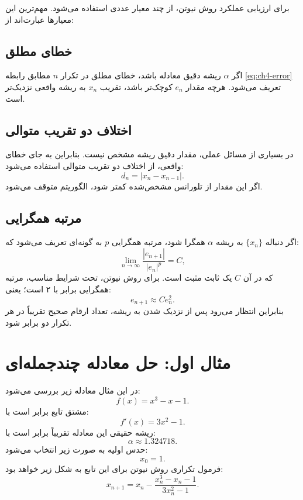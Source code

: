 برای ارزیابی عملکرد روش نیوتن، از چند معیار عددی استفاده می‌شود. مهم‌ترین این معیارها عبارت‌اند از:

\subsection{خطای مطلق}

اگر $\alpha$ ریشه دقیق معادله باشد، خطای مطلق در تکرار $n$ مطابق رابطه \eqref{eq:ch4-error} تعریف می‌شود. هرچه مقدار $e_n$ کوچک‌تر باشد، تقریب $x_n$ به ریشه واقعی نزدیک‌تر است.

\subsection{اختلاف دو تقریب متوالی}

در بسیاری از مسائل عملی، مقدار دقیق ریشه مشخص نیست. بنابراین به جای خطای واقعی، از اختلاف دو تقریب متوالی استفاده می‌شود:
\begin{equation}
d_n = |x_n-x_{n-1}|.
\label{eq:ch4-diff}
\end{equation}
اگر این مقدار از تلورانس مشخص‌شده کمتر شود، الگوریتم متوقف می‌شود.

\subsection{مرتبه همگرایی}

اگر دنباله $\{x_n\}$ به ریشه $\alpha$ همگرا شود، مرتبه همگرایی $p$ به گونه‌ای تعریف می‌شود که:
\begin{equation}
\lim_{n\to\infty}\frac{|e_{n+1}|}{|e_n|^p}=C,
\label{eq:ch4-order}
\end{equation}
که در آن $C$ یک ثابت مثبت است. برای روش نیوتن، تحت شرایط مناسب، مرتبه همگرایی برابر با ۲ است؛ یعنی:
\begin{equation}
e_{n+1}\approx C e_n^2.
\label{eq:ch4-quadratic}
\end{equation}
بنابراین انتظار می‌رود پس از نزدیک شدن به ریشه، تعداد ارقام صحیح تقریباً در هر تکرار دو برابر شود.

\section{مثال اول: حل معادله چندجمله‌ای}
\label{sec:examples}

در این مثال معادله زیر بررسی می‌شود:
\begin{equation}
f(x)=x^3-x-1.
\label{eq:ch4-ex1-func}
\end{equation}
مشتق تابع برابر است با:
\begin{equation}
f'(x)=3x^2-1.
\label{eq:ch4-ex1-deriv}
\end{equation}
ریشه حقیقی این معادله تقریباً برابر است با:
\[
\alpha \approx 1.324718.
\]
حدس اولیه به صورت زیر انتخاب می‌شود:
\[
x_0=1.
\]
فرمول تکراری روش نیوتن برای این تابع به شکل زیر خواهد بود:
\begin{equation}
x_{n+1}
=
x_n-\frac{x_n^3-x_n-1}{3x_n^2-1}.
\label{eq:ch4-ex1-newton}
\end{equation}


